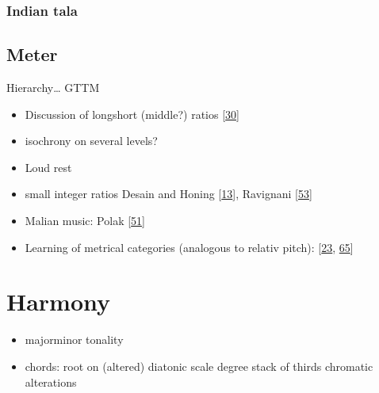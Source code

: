 \documentclass[letterpaper,10pt,english]{sphinxmanual}
\begin{document}
\subsection{Indian tala}
\label{\detokenize{4_time:indian-tala}}

\section{Meter}
\label{\detokenize{4_time:meter}}
\sphinxAtStartPar
Hierarchy… GTTM
\begin{itemize}
\item {} 
\sphinxAtStartPar
Discussion of long\sphinxhyphen{}short (middle?) ratios {[}\hyperlink{cite.8_bibliography:id8}{30}{]}

\item {} 
\sphinxAtStartPar
isochrony on several levels?

\item {} 
\sphinxAtStartPar
Loud rest

\item {} 
\sphinxAtStartPar
small integer ratios Desain and Honing {[}\hyperlink{cite.8_bibliography:id11}{13}{]}, Ravignani  {[}\hyperlink{cite.8_bibliography:id9}{53}{]}

\item {} 
\sphinxAtStartPar
Malian music: Polak  {[}\hyperlink{cite.8_bibliography:id7}{51}{]}

\item {} 
\sphinxAtStartPar
Learning of metrical categories (analogous to relativ pitch): {[}\hyperlink{cite.8_bibliography:id39}{23}, \hyperlink{cite.8_bibliography:id40}{65}{]}

\end{itemize}


\chapter{Harmony}
\label{\detokenize{4_harmony:harmony}}\label{\detokenize{4_harmony::doc}}\begin{itemize}
\item {} 
\sphinxAtStartPar
major\sphinxhyphen{}minor tonality

\item {} 
\sphinxAtStartPar
chords:
\sphinxhyphen{} root on (altered) diatonic scale degree
\sphinxhyphen{} stack of thirds
\sphinxhyphen{} chromatic alterations

\end{itemize}
\end{document}
